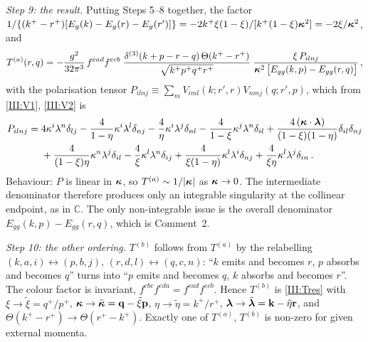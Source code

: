 \emph{Step 9: the result.} Putting Steps 5--8 together, the factor $1/\{(k^+-r^+)[E_g(k)-E_g(r)-E_g(r')]\}=-2k^+\xi(1-\xi)/[k^+(1-\xi)\boldsymbol\kappa^2]=-2\xi/\boldsymbol\kappa^2$, and
\begin{equation}
T^{(a)}(r,q)=-\frac{g^2}{32\pi^3}\,f^{ead}f^{ecb}\;
\frac{\delta^{(3)}(k+p-r-q)\,\Theta(k^+-r^+)}{\sqrt{k^+p^+q^+r^+}}\;
\frac{\xi\,P_{ilnj}}{\boldsymbol\kappa^2\,\big[E_{gg}(k,p)-E_{gg}(r,q)\big]}\,,
\label{III:Tres}
\end{equation}
with the polarisation tensor $P_{ilnj}\equiv\sum_m V_{iml}(k;r',r)V_{nmj}(q;r',p)$, which from \eqref{III:V1}, \eqref{III:V2} is
\begin{align}
P_{ilnj}={}&4\kappa^i\lambda^n\delta_{lj}-\frac{4}{1-\eta}\kappa^i\lambda^l\delta_{nj}-\frac{4}{\eta}\kappa^i\lambda^j\delta_{nl}
-\frac{4}{1-\xi}\kappa^j\lambda^n\delta_{il}+\frac{4\,(\boldsymbol\kappa\cdot\boldsymbol\lambda)}{(1-\xi)(1-\eta)}\delta_{il}\delta_{nj}\nonumber\\
&+\frac{4}{(1-\xi)\eta}\kappa^n\lambda^j\delta_{il}-\frac{4}{\xi}\kappa^l\lambda^n\delta_{ij}+\frac{4}{\xi(1-\eta)}\kappa^l\lambda^i\delta_{nj}+\frac{4}{\xi\eta}\kappa^l\lambda^j\delta_{in}\,.
\label{III:P}
\end{align}
Behaviour: $P$ is linear in $\boldsymbol\kappa$, so $T^{(a)}\sim1/|\boldsymbol\kappa|$ as $\boldsymbol\kappa\to0$. The intermediate denominator therefore produces only an integrable singularity at the collinear endpoint, as in $\mathbb C$. The only non-integrable issue is the overall denominator $E_{gg}(k,p)-E_{gg}(r,q)$, which is Comment~2.

\emph{Step 10: the other ordering.} $T^{(b)}$ follows from $T^{(a)}$ by the relabelling $(k,a,i)\leftrightarrow(p,b,j)$, $(r,d,l)\leftrightarrow(q,c,n)$: ``$k$ emits and becomes $r$, $p$ absorbs and becomes $q$'' turns into ``$p$ emits and becomes $q$, $k$ absorbs and becomes $r$''. The colour factor is invariant, $f^{ebc}f^{eda}=f^{ead}f^{ecb}$. Hence $T^{(b)}$ is \eqref{III:Tres} with $\xi\to\tilde\xi=q^+/p^+$, $\boldsymbol\kappa\to\tilde{\boldsymbol\kappa}=\mathbf{q}-\tilde\xi\mathbf{p}$, $\eta\to\tilde\eta=k^+/r^+$, $\boldsymbol\lambda\to\tilde{\boldsymbol\lambda}=\mathbf{k}-\tilde\eta\mathbf{r}$, and $\Theta(k^+-r^+)\to\Theta(r^+-k^+)$. Exactly one of $T^{(a)}$, $T^{(b)}$ is non-zero for given external momenta.

